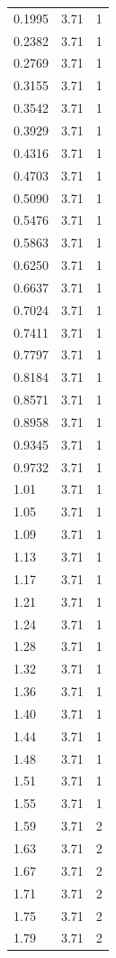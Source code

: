 \begin{longtable}{lrr}
  0.1995 & 3.71 & 1 \\
  0.2382 & 3.71 & 1 \\
  0.2769 & 3.71 & 1 \\
  0.3155 & 3.71 & 1 \\
  0.3542 & 3.71 & 1 \\
  0.3929 & 3.71 & 1 \\
  0.4316 & 3.71 & 1 \\
  0.4703 & 3.71 & 1 \\
  0.5090 & 3.71 & 1 \\
  0.5476 & 3.71 & 1 \\
  0.5863 & 3.71 & 1 \\
  0.6250 & 3.71 & 1 \\
  0.6637 & 3.71 & 1 \\
  0.7024 & 3.71 & 1 \\
  0.7411 & 3.71 & 1 \\
  0.7797 & 3.71 & 1 \\
  0.8184 & 3.71 & 1 \\
  0.8571 & 3.71 & 1 \\
  0.8958 & 3.71 & 1 \\
  0.9345 & 3.71 & 1 \\
  0.9732 & 3.71 & 1 \\
  1.01 & 3.71 & 1 \\
  1.05 & 3.71 & 1 \\
  1.09 & 3.71 & 1 \\
  1.13 & 3.71 & 1 \\
  1.17 & 3.71 & 1 \\
  1.21 & 3.71 & 1 \\
  1.24 & 3.71 & 1 \\
  1.28 & 3.71 & 1 \\
  1.32 & 3.71 & 1 \\
  1.36 & 3.71 & 1 \\
  1.40 & 3.71 & 1 \\
  1.44 & 3.71 & 1 \\
  1.48 & 3.71 & 1 \\
  1.51 & 3.71 & 1 \\
  1.55 & 3.71 & 1 \\
  1.59 & 3.71 & 2 \\
  1.63 & 3.71 & 2 \\
  1.67 & 3.71 & 2 \\
  1.71 & 3.71 & 2 \\
  1.75 & 3.71 & 2 \\
  1.79 & 3.71 & 2 \\

\end{longtable}
